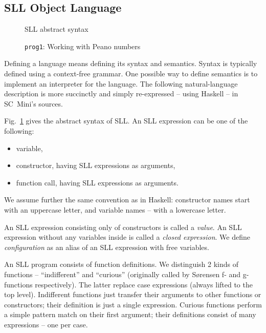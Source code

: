 \subsection{SLL Object Language}
\label{sec-formalities}

\begin{figure}[t!]
\caption{SLL abstract syntax}

\label{fig-sll-syntax}
\end{figure}

\begin{figure}[t!]
\caption{\texttt{prog1}: Working with Peano numbers}
\label{fig:prog1}

\end{figure}

Defining a language means defining its syntax and semantics. 
Syntax is typically defined using a context-free grammar.
One possible way to define semantics is to implement an interpreter for the language.
The following natural-language description is more succinctly and simply 
re-expressed -- using Haskell -- in SC~Mini's sources.

Fig.~\ref{fig-sll-syntax} gives the abstract syntax of SLL.
An SLL expression can be one of the following:
\begin{itemize}
  \item variable,
  \item constructor, having SLL expressions as arguments,
  \item function call, having SLL expressions as arguments.
\end{itemize}

We assume further the same convention as in Haskell: constructor names start
with an uppercase letter, and variable names -- with a lowercase letter.

An SLL expression consisting only of constructors is called a \emph{value}.
An SLL expression without any variables inside is called a \emph{closed expression}.
We define \emph{configuration} as an alias of an SLL expression with free variables.

An SLL program consists of function definitions.
We distinguish 2 kinds of functions -- ``indifferent'' and ``curious''
(originally called by S{\o}rensen f- and g-functions respectively).
The latter replace case expressions (always lifted to the top level).
Indifferent functions just transfer their arguments to other functions or constructors;
their definition is just a single expression.
Curious functions perform a simple pattern match on their first argument;
their definitions consist of many expressions -- one per case.

